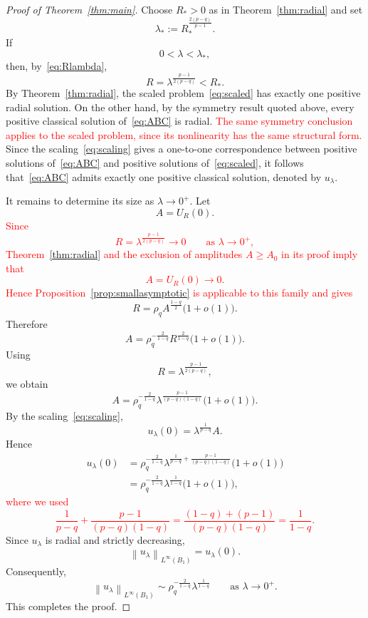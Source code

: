 \documentclass[11pt]{article}
\newcommand{\norm}[1]{\left\|#1\right\|}
\theoremstyle{definition}
\begin{document}
\begin{proof}[Proof of Theorem~\ref{thm:main}]
Choose $R_*>0$ as in Theorem~\ref{thm:radial} and set
\[
\lambda_*
:=
R_*^{\frac{2(p-q)}{p-1}}.
\]
If
\[
0<\lambda<\lambda_*,
\]
then, by~\eqref{eq:Rlambda},
\[
R
=
\lambda^{\frac{p-1}{2(p-q)}}
<
R_*.
\]
By Theorem~\ref{thm:radial}, the scaled
problem~\eqref{eq:scaled} has exactly one positive radial solution.
On the other hand, by the symmetry result quoted above, every
positive classical solution of~\eqref{eq:ABC} is radial.
\textcolor{red}{The same symmetry conclusion applies to the scaled
problem, since its nonlinearity has the same structural form.}
Since the
scaling~\eqref{eq:scaling} gives a one-to-one correspondence between
positive solutions of~\eqref{eq:ABC} and positive solutions
of~\eqref{eq:scaled}, it follows that~\eqref{eq:ABC} admits exactly
one positive classical solution, denoted by $u_\lambda$.

It remains to determine its size as $\lambda\to0^+$. Let
\[
A=U_R(0).
\]
\textcolor{red}{Since
\[
R=\lambda^{\frac{p-1}{2(p-q)}}\longrightarrow0
\qquad\text{as }\lambda\to0^+,
\]
Theorem~\ref{thm:radial} and the exclusion of amplitudes
$A\geq A_0$ in its proof imply that
\[
A=U_R(0)\longrightarrow0.
\]
Hence Proposition~\ref{prop:smallasymptotic} is applicable to this
family and gives}
\[
R
=
\rho_q A^{\frac{1-q}{2}}
\bigl(1+o(1)\bigr).
\]
Therefore
\[
A
=
\rho_q^{-\frac{2}{1-q}}
R^{\frac{2}{1-q}}
\bigl(1+o(1)\bigr).
\]
Using
\[
R
=
\lambda^{\frac{p-1}{2(p-q)}},
\]
we obtain
\[
A
=
\rho_q^{-\frac{2}{1-q}}
\lambda^{\frac{p-1}{(p-q)(1-q)}}
\bigl(1+o(1)\bigr).
\]
By the scaling~\eqref{eq:scaling},
\[
u_\lambda(0)
=
\lambda^{\frac1{p-q}}A.
\]
Hence
\begin{align*}
u_\lambda(0)
&=
\rho_q^{-\frac{2}{1-q}}
\lambda^{
\frac1{p-q}
+
\frac{p-1}{(p-q)(1-q)}
}
\bigl(1+o(1)\bigr)
\\
&=
\rho_q^{-\frac{2}{1-q}}
\lambda^{\frac1{1-q}}
\bigl(1+o(1)\bigr),
\end{align*}
\textcolor{red}{where we used
\[
\frac1{p-q}
+
\frac{p-1}{(p-q)(1-q)}
=
\frac{(1-q)+(p-1)}{(p-q)(1-q)}
=
\frac1{1-q}.
\]}
Since $u_\lambda$ is radial and strictly decreasing,
\[
\norm{u_\lambda}_{L^\infty(B_1)}
=
u_\lambda(0).
\]
Consequently,
\begin{equation}
\label{eq:main-asymptotic}
\norm{u_\lambda}_{L^\infty(B_1)}
\sim
\rho_q^{-\frac{2}{1-q}}
\lambda^{\frac1{1-q}}
\qquad
\text{as }\lambda\to0^+.
\end{equation}
This completes the proof.
\end{proof}
    
\end{document}
